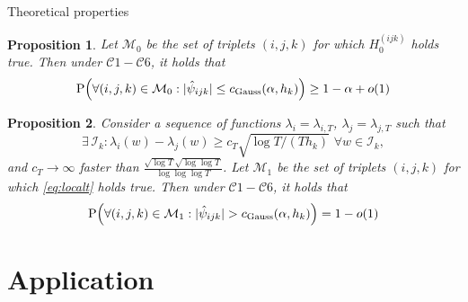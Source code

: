 \documentclass[10pt, handout]{beamer}
\newcommand{\Prob}{\mathrm{P}}
\newtheorem{prop}{Proposition}
\begin{document}
\begin{frame}{Theoretical properties}
\begin{prop}\label{prop1}
Let $\mathcal{M}_0$ be the set of triplets $(i, j, k)$ for which $H_0^{(ijk)}$ holds true. Then under $\mathcal{C}1 - \mathcal{C}6$, it holds that 
\vspace{-2mm}
\begin{align*}
 \Prob\Big( \forall (i,j,k) \in \mathcal{M}_0: |\hat{\psi}_{ijk}| \le c_{\textnormal{Gauss}}(\alpha,h_k) \Big) \ge 1 - \alpha + o(1)
\end{align*}
\end{prop}\pause
\begin{prop}\label{prop2}
Consider a sequence of functions $\lambda_{i} = \lambda_{i,T}$, $\lambda_{j} = \lambda_{j, T}$ such that 
\begin{equation}\label{eq:localt}
\exists \, \mathcal{I}_{k}:  \lambda_{i}(w) - \lambda_{j}(w) \ge c_T \sqrt{\log T / (T h_{k})} \,\, \forall w \in \mathcal{I}_{k},
\end{equation} and $c_T \rightarrow \infty$ faster than $\frac{\sqrt{\log T}\sqrt{\log \log T}}{\log \log \log T}$.  Let $\mathcal{M}_1$ be the set of triplets $(i, j, k)$ for which \eqref{eq:localt} holds true. Then under $\mathcal{C}1 - \mathcal{C}6$, it holds that
\vspace{-2mm}
\begin{equation*}
\Prob\Big( \forall (i,j,k) \in \mathcal{M}_1: |\hat{\psi}_{ijk}| > c_{\textnormal{Gauss}}(\alpha,h_k) \Big) = 1 - o(1)
\end{equation*}
\end{prop}
\end{frame}

\section{Application}
\end{document}
